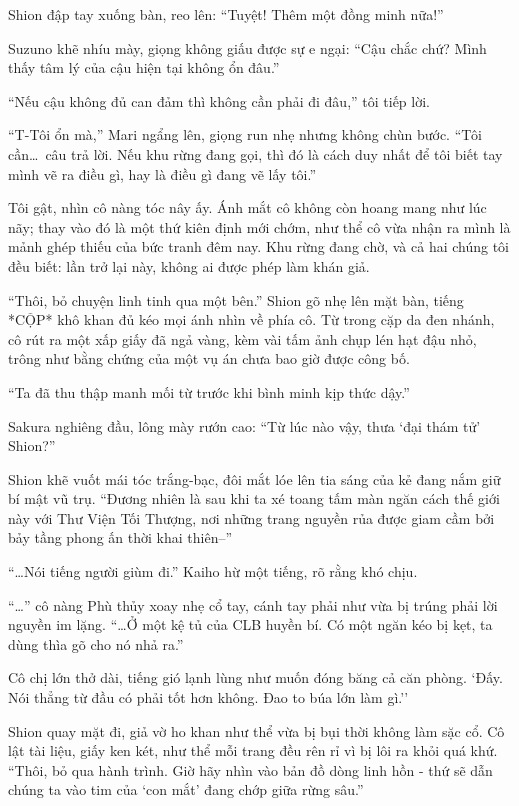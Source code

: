 \documentclass[../main.tex]{subfiles}
\begin{document}
Shion đập tay xuống bàn, reo lên: ``Tuyệt! Thêm một đồng minh nữa!''

Suzuno khẽ nhíu mày, giọng không giấu được sự e ngại: ``Cậu chắc chứ? Mình thấy tâm lý của cậu hiện tại không ổn đâu.''

``Nếu cậu không đủ can đảm thì không cần phải đi đâu,'' tôi tiếp lời.

``T-Tôi ổn mà,'' Mari ngẩng lên, giọng run nhẹ nhưng không chùn bước. ``Tôi cần\dots\ câu trả lời. Nếu khu rừng đang gọi, thì đó là cách duy nhất để tôi biết tay mình vẽ ra điều gì, hay là điều gì đang vẽ lấy tôi.''

Tôi gật, nhìn cô nàng tóc nây ấy. Ánh mắt cô không còn hoang mang như lúc nãy; thay vào đó là một thứ kiên định mới chớm, như thể cô vừa nhận ra mình là mảnh ghép thiếu của bức tranh đêm nay. Khu rừng đang chờ, và cả hai chúng tôi đều biết: lần trở lại này, không ai được phép làm khán giả.

``Thôi, bỏ chuyện linh tinh qua một bên.'' Shion gõ nhẹ lên mặt bàn, tiếng *CỘP* khô khan đủ kéo mọi ánh nhìn về phía cô. Từ trong cặp da đen nhánh, cô rút ra một xấp giấy đã ngả vàng, kèm vài tấm ảnh chụp lén hạt đậu nhỏ, trông như bằng chứng của một vụ án chưa bao giờ được công bố.

``Ta đã thu thập manh mối từ trước khi bình minh kịp thức dậy.''

Sakura nghiêng đầu, lông mày rướn cao: ``Từ lúc nào vậy, thưa `đại thám tử' Shion?''

Shion khẽ vuốt mái tóc trắng-bạc, đôi mắt lóe lên tia sáng của kẻ đang nắm giữ bí mật vũ trụ. ``Đương nhiên là sau khi ta xé toang tấm màn ngăn cách thế giới này với Thư Viện Tối Thượng, nơi những trang nguyền rủa được giam cầm bởi bảy tầng phong ấn thời khai thiên--''

``\dots Nói tiếng người giùm đi.'' Kaiho hừ một tiếng, rõ rằng khó chịu.

``\dots'' cô nàng Phù thủy xoay nhẹ cổ tay, cánh tay phải như vừa bị trúng phải lời nguyền im lặng. ``\dots Ở một kệ tủ của CLB huyền bí. Có một ngăn kéo bị kẹt, ta dùng thìa gõ cho nó nhả ra.''

Cô chị lớn thở dài, tiếng gió lạnh lùng như muốn đóng băng cả căn phòng. `Đấy. Nói thẳng từ đầu có phải tốt hơn không. Đao to búa lớn làm gì.''

Shion quay mặt đi, giả vờ ho khan như thể vừa bị bụi thời không làm sặc cổ. Cô lật tài liệu, giấy ken két, như thể mỗi trang đều rên rỉ vì bị lôi ra khỏi quá khứ. ``Thôi, bỏ qua hành trình. Giờ hãy nhìn vào bản đồ dòng linh hồn - thứ sẽ dẫn chúng ta vào tim của `con mắt' đang chớp giữa rừng sâu.''
\end{document}
